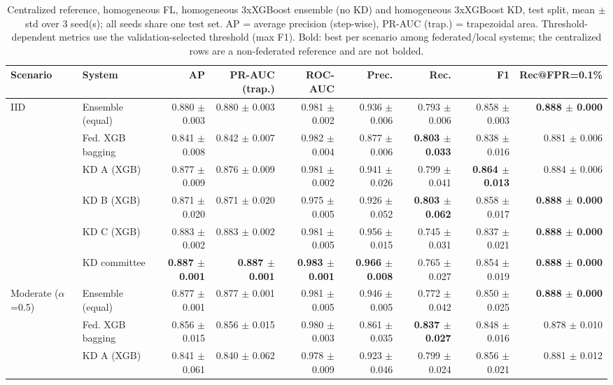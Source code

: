 \begin{table}[t]
\centering
\scriptsize
\caption{Centralized reference, homogeneous FL, homogeneous 3xXGBoost ensemble (no KD) and homogeneous 3xXGBoost KD, test split, mean $\pm$ std over 3 seed(s); all seeds share one test set. AP = average precision (step-wise), PR-AUC (trap.) = trapezoidal area. Threshold-dependent metrics use the validation-selected threshold (max F1). Bold: best per scenario among federated/local systems; the centralized rows are a non-federated reference and are not bolded.}
\label{tab:main}
\begin{tabular}{llrrrrrrr}
\toprule
Scenario & System & AP & PR-AUC (trap.) & ROC-AUC & Prec. & Rec. & F1 & Rec@FPR=0.1\% \\
\midrule
IID & Ensemble (equal) & 0.880 $\pm$ 0.003 & 0.880 $\pm$ 0.003 & 0.981 $\pm$ 0.002 & 0.936 $\pm$ 0.006 & 0.793 $\pm$ 0.006 & 0.858 $\pm$ 0.003 & \textbf{0.888 $\pm$ 0.000} \\
 & Fed. XGB bagging & 0.841 $\pm$ 0.008 & 0.842 $\pm$ 0.007 & 0.982 $\pm$ 0.004 & 0.877 $\pm$ 0.006 & \textbf{0.803 $\pm$ 0.033} & 0.838 $\pm$ 0.016 & 0.881 $\pm$ 0.006 \\
 & KD A (XGB) & 0.877 $\pm$ 0.009 & 0.876 $\pm$ 0.009 & 0.981 $\pm$ 0.002 & 0.941 $\pm$ 0.026 & 0.799 $\pm$ 0.041 & \textbf{0.864 $\pm$ 0.013} & 0.884 $\pm$ 0.006 \\
 & KD B (XGB) & 0.871 $\pm$ 0.020 & 0.871 $\pm$ 0.020 & 0.975 $\pm$ 0.005 & 0.926 $\pm$ 0.052 & \textbf{0.803 $\pm$ 0.062} & 0.858 $\pm$ 0.017 & \textbf{0.888 $\pm$ 0.000} \\
 & KD C (XGB) & 0.883 $\pm$ 0.002 & 0.883 $\pm$ 0.002 & 0.981 $\pm$ 0.005 & 0.956 $\pm$ 0.015 & 0.745 $\pm$ 0.031 & 0.837 $\pm$ 0.021 & \textbf{0.888 $\pm$ 0.000} \\
 & KD committee & \textbf{0.887 $\pm$ 0.001} & \textbf{0.887 $\pm$ 0.001} & \textbf{0.983 $\pm$ 0.001} & \textbf{0.966 $\pm$ 0.008} & 0.765 $\pm$ 0.027 & 0.854 $\pm$ 0.019 & \textbf{0.888 $\pm$ 0.000} \\
\midrule
Moderate ($\alpha$=0.5) & Ensemble (equal) & 0.877 $\pm$ 0.001 & 0.877 $\pm$ 0.001 & 0.981 $\pm$ 0.005 & 0.946 $\pm$ 0.005 & 0.772 $\pm$ 0.042 & 0.850 $\pm$ 0.025 & \textbf{0.888 $\pm$ 0.000} \\
 & Fed. XGB bagging & 0.856 $\pm$ 0.015 & 0.856 $\pm$ 0.015 & 0.980 $\pm$ 0.003 & 0.861 $\pm$ 0.035 & \textbf{0.837 $\pm$ 0.027} & 0.848 $\pm$ 0.016 & 0.878 $\pm$ 0.010 \\
 & KD A (XGB) & 0.841 $\pm$ 0.061 & 0.840 $\pm$ 0.062 & 0.978 $\pm$ 0.009 & 0.923 $\pm$ 0.046 & 0.799 $\pm$ 0.024 & 0.856 $\pm$ 0.021 & 0.881 $\pm$ 0.012 \\

\end{tabular}
\end{table}
